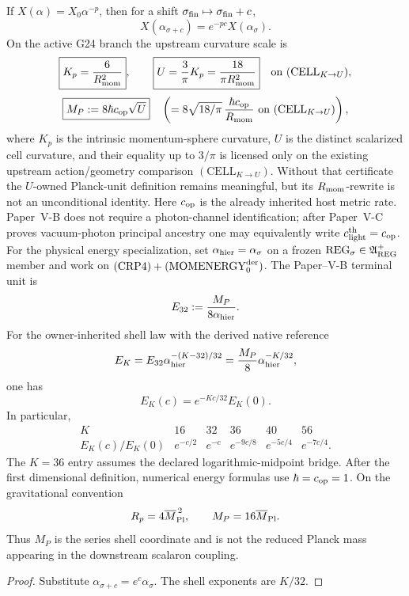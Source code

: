\documentclass[12pt,a4paper]{article}
\begin{document}
\begin{theorem}
\label{p6:thm:finite-part-covariance}
If \(X(\alpha)=X_0\alpha^{-p}\), then for a shift
\(\sigma_{\rm fin}\mapsto\sigma_{\rm fin}+c\),
\[
X(\alpha_{\sigma+c})=e^{-pc}X(\alpha_{\sigma}).
\]
On the active G24 branch the upstream curvature scale is
\[
\boxed{K_p=\frac6{R_{\rm mom}^2}},
\qquad
\boxed{U=\frac3\pi K_p=\frac{18}{\pi R_{\rm mom}^2}}
\quad\text{on }(\mathrm{CELL}_{K\to U}),
\]
\[
\boxed{M_P:=8\hbar c_{\rm op}\sqrt U}
\quad\left(=8\sqrt{18/\pi}\,\frac{\hbar c_{\rm op}}{R_{\rm mom}}
\text{ on }(\mathrm{CELL}_{K\to U})\right),
\]
where \(K_p\) is the intrinsic momentum-sphere curvature,
\(U\) is the distinct scalarized cell curvature, and their equality up to
\(3/\pi\) is licensed only on the existing upstream action/geometry
comparison \((\mathrm{CELL}_{K\to U})\). Without that certificate the
\(U\)-owned Planck-unit definition remains meaningful, but its
\(R_{\rm mom}\)-rewrite is not an unconditional identity. Here
\(c_{\rm op}\) is the already inherited host metric rate.  Paper~V-B
does not require a photon-channel identification; after Paper~V-C proves
vacuum-photon principal ancestry one may equivalently write
\(c_{\rm light}^{\rm th}=c_{\rm op}\).
For the physical energy specialization, set
\(\alpha_{\rm hier}=\alpha_{\sigma}\) on a frozen
\(\mathrm{REG}_{\sigma}\in\mathfrak A_{\rm REG}^{+}\) member and work on
\((\mathrm{CRP4})+(\mathrm{MOMENERGY}_{0}^{\rm der})\).  The Paper--V-B
terminal unit is
\[
E_{32}:=\frac{M_P}{8\alpha_{\rm hier}}.
\]
For the owner-inherited shell law with the derived native reference
\[
E_K
=
E_{32}\alpha_{\rm hier}^{-(K-32)/32}
=
\frac{M_P}{8}\alpha_{\rm hier}^{-K/32},
\]
one has
\[
\boxed{E_K(c)=e^{-Kc/32}E_K(0).}
\]
In particular,
\[
\begin{array}{c|ccccc}
K&16&32&36&40&56\\
\hline
E_K(c)/E_K(0)
&e^{-c/2}&e^{-c}&e^{-9c/8}&e^{-5c/4}&e^{-7c/4}.
\end{array}
\]
The \(K=36\) entry assumes the declared logarithmic-midpoint bridge.
After the first dimensional definition, numerical energy formulas use
\(\hbar=c_{\rm op}=1\).  On the gravitational convention
\[
R_p=4\overline M_{\rm Pl}^{\,2},
\qquad
M_P=16\overline M_{\rm Pl}.
\]
Thus \(M_P\) is the series shell coordinate and is not the reduced Planck
mass appearing in the downstream scalaron coupling.
\end{theorem}

\begin{proof}
Substitute \(\alpha_{\sigma+c}=e^c\alpha_{\sigma}\).  The shell exponents are \(K/32\).
\end{proof}
\end{document}
